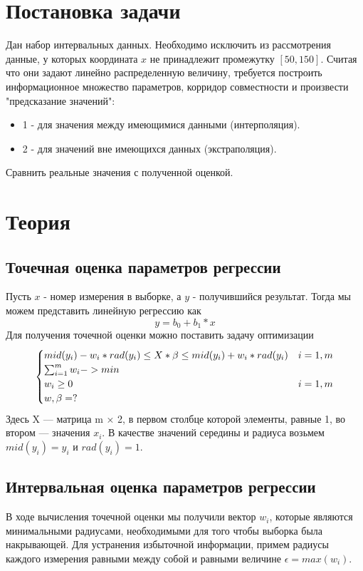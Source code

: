 \documentclass[a4paper,12pt]{article}
\begin{document}

\newpage
\tableofcontents
\newpage
\listoffigures
\newpage
\section{Постановка задачи}
Дан набор интервальных данных. Необходимо исключить из рассмотрения данные, у которых координата $x$ не принадлежит промежутку $[50, 150]$. Считая что они задают линейно распределенную величину, требуется построить информационное множество параметров, корридор совместности и произвести "предсказание значений": 
\begin{itemize}
    \item 1 - для значения между имеющимися данными (интерполяция).
    \item 2 - для значений вне имеющихся данных (экстраполяция).
\end{itemize}
Сравнить реальные значения с полученной оценкой.
\section{Теория}
\subsection{Точечная оценка параметров регрессии}
     Пусть $x$ - номер измерения в выборке, а $y$ - получившийся результат. Тогда мы можем представить линейную регрессию как
     $$ y = b_0 + b_1 * x$$
     Для получения точечной оценки можно поставить задачу оптимизации
     \begin{equation}
        \begin{cases}
            $$mid(y_i) - w_i * rad(y_i) \le X *\beta \le mid(y_i) + w_i * rad(y_i)$$ & i=1,m\\
            $$\sum_{i = 1}^m w_i -> min$$ \\
            $$w_i \ge 0$$ & i = 1,m \\
            $$w, \beta = ?$$
        \end{cases}       
    \end{equation}
    Здесь X — матрица m × 2, в первом столбце которой элементы, равные 1,
во втором — значения $x_i$. В качестве значений середины и радиуса возьмем
$mid(y_i) = y_i$ и $rad(y_i) = 1$.
\subsection{Интервальная оценка параметров регрессии}
В ходе вычисления точечной оценки мы получили вектор $w_i$, которые являются минимальными радиусами, необходимыми для того чтобы выборка была накрывающей. Для устранения избыточной информации, примем радиусы каждого измерения равными между собой и равными величине $\epsilon = max(w_i)$.
\end{document}
